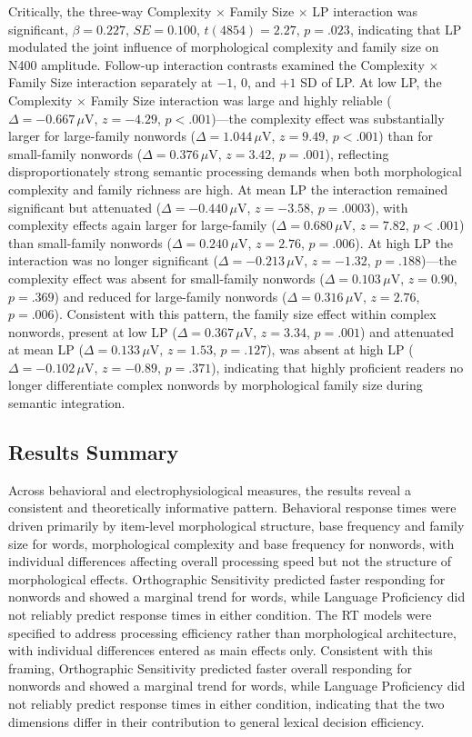 \documentclass[utf8]{FrontiersinHarvard} %
\begin{document}
Critically, the three-way Complexity $\times$ Family Size $\times$ LP interaction was significant, $\beta = 0.227$, $SE = 0.100$, $t(4854) = 2.27$, $p = .023$, indicating that LP modulated the joint influence of morphological complexity and family size on N400 amplitude. Follow-up interaction contrasts examined the Complexity $\times$ Family Size interaction separately at $-1$, $0$, and $+1$ SD of LP. At low LP, the Complexity $\times$ Family Size interaction was large and highly reliable ($\Delta = -0.667\,\mu$V, $z = -4.29$, $p < .001$)—the complexity effect was substantially larger for large-family nonwords ($\Delta = 1.044\,\mu$V, $z = 9.49$, $p < .001$) than for small-family nonwords ($\Delta = 0.376\,\mu$V, $z = 3.42$, $p = .001$), reflecting disproportionately strong semantic processing demands when both morphological complexity and family richness are high. At mean LP the interaction remained significant but attenuated ($\Delta = -0.440\,\mu$V, $z = -3.58$, $p = .0003$), with complexity effects again larger for large-family ($\Delta = 0.680\,\mu$V, $z = 7.82$, $p < .001$) than small-family nonwords ($\Delta = 0.240\,\mu$V, $z = 2.76$, $p = .006$). At high LP the interaction was no longer significant ($\Delta = -0.213\,\mu$V, $z = -1.32$, $p = .188$)—the complexity effect was absent for small-family nonwords ($\Delta = 0.103\,\mu$V, $z = 0.90$, $p = .369$) and reduced for large-family nonwords ($\Delta = 0.316\,\mu$V, $z = 2.76$, $p = .006$). Consistent with this pattern, the family size effect within complex nonwords, present at low LP ($\Delta = 0.367\,\mu$V, $z = 3.34$, $p = .001$) and attenuated at mean LP ($\Delta = 0.133\,\mu$V, $z = 1.53$, $p = .127$), was absent at high LP ($\Delta = -0.102\,\mu$V, $z = -0.89$, $p = .371$), indicating that highly proficient readers no longer differentiate complex nonwords by morphological family size during semantic integration.



\subsection{Results Summary}

Across behavioral and electrophysiological measures, the results reveal a consistent and theoretically informative pattern. Behavioral response times were driven primarily by item-level morphological structure, base frequency and family size for words, morphological complexity and base frequency for nonwords, with individual differences affecting overall processing speed but not the structure of morphological effects. Orthographic Sensitivity predicted faster responding for nonwords and showed a marginal trend for words, while Language Proficiency did not reliably predict response times in either condition. The RT models were specified to address processing efficiency rather than morphological architecture, with individual differences entered as main effects only. Consistent with this framing, Orthographic Sensitivity predicted faster overall responding for nonwords and showed a marginal trend for words, while Language Proficiency did not reliably predict response times in either condition, indicating that the two dimensions differ in their contribution to general lexical decision efficiency.
\end{document}
